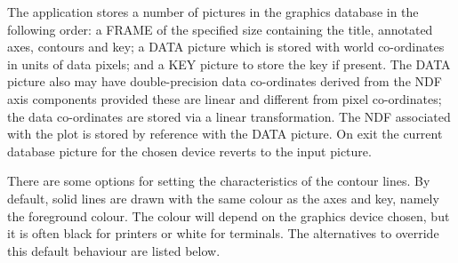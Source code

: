 \documentclass[twoside,11pt,nolof]{starlink}
\begin{document}
{{{         \sstitem
         The application stores a number of pictures in the graphics
         database in the following order: a FRAME of the specified size
         containing the title, annotated axes, contours and key; a DATA
         picture which is stored with world co-ordinates in units of data
         pixels; and a KEY picture to store the key if present.  The DATA
         picture also may have double-precision data co-ordinates derived
         from the NDF axis components provided these are linear and
         different from pixel co-ordinates; the data co-ordinates are
         stored via a linear transformation.  The NDF associated with the
         plot is stored by reference with the DATA picture.  On exit the
         current database picture for the chosen device reverts to the
         input picture.

         \sstitem
         There are some options for setting the characteristics of the
         contour lines.  By default, solid lines are drawn with the same
         colour as the axes and key, namely the foreground colour.  The
         colour will depend on the graphics device chosen, but it is often
         black for printers or white for terminals.  The alternatives to
         override this default behaviour are listed below.

}}}
\end{document}
